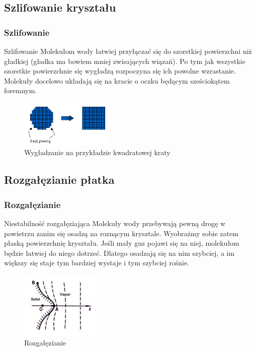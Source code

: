 \documentclass[]{beamer}
\begin{document}
\subsection{Szlifowanie kryształu}

\begin{frame}
	\frametitle{Szlifowanie}
	\begin{block}{Szlifowanie}
	Molekułom wody łatwiej przyłączać się do szorstkiej powierzchni niż gładkiej (gładka ma bowiem mniej zwisających wiązań). 
	Po tym jak wszystkie szorstkie powierzchnie się wygładzą rozpoczyna się ich powolne wzrastanie. Molekuły docelowo układają się na kracie 
	o oczku będącym sześciokątem foremnym.
	\end{block}
	\begin{figure}[h]
		\centering
		\includegraphics[width=0.4\textwidth]{facetting-square.png}
		\caption{Wygładzanie na przykładzie kwadratowej kraty}
	\end{figure}
\end{frame}


\subsection{Rozgałęzianie płatka}


\begin{frame}
	\frametitle{Rozgałęzianie}
	\begin{block}{Niestabilność rozgałęziająca}
	Molekuły wody przebywają pewną drogę w powietrzu zanim się osadzą na roznącym krysztale. 	
	Wyobrażmy sobie zatem płaską powierzchnię kryształu. Jeśli mały guz pojawi się na niej, molekułom będzie łatwiej do niego dotrzeć.
	Dlatego osadzają się na nim szybciej, a im większy się staje tym bardziej wystaje i tym szybciej rośnie. 
	\end{block}
	\begin{figure}[h]
		\centering
		\includegraphics{branching-start.jpg}
		\caption{Rozgałęzianie}
	\end{figure}
\end{frame}
\end{document}

